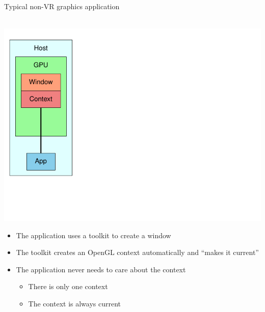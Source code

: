 \documentclass[utf8,stillsansserifmath,fleqn,t]{beamer}
\begin{document}
\begin{frame}
\frametitle{\insertsection}
\centerline{Typical non-VR graphics application}~\\
\includegraphics[height=.75\textheight]{./fig/setup-simple.pdf}\\
\vspace*{-.75\textheight}\hspace*{.27\textwidth}\begin{minipage}{.72\textwidth}
\begin{itemize}
\item The application uses a toolkit to create a window
\item The toolkit creates an OpenGL context automatically and ``makes it
current''
\item The application never needs to care about the context
    \begin{itemize}
    \item There is only one context
    \item The context is always current
    \end{itemize}
\end{itemize}
\end{minipage}
\end{frame}
\end{document}
